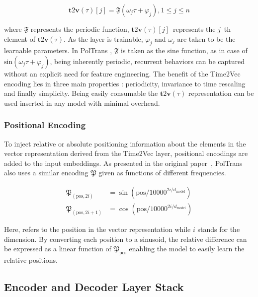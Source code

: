 \documentclass[10pt,journal]{IEEEtran}
\begin{document}
\begin{equation}
\mathbf{t} 2 \mathbf{v}(\tau)[j]=\mathfrak{F}\left(\omega_{j} \tau+\varphi_{j}\right), 1 \leq j \leq n
\end{equation}

where $\mathfrak{F}$ represents the periodic function, ${\mathbf{t} 2 \mathbf{v}(\tau)[j]}$~represents the ${j}$~th element of ${\mathbf{t} 2 \mathbf{v}(\tau)}$. As the layer is trainable, $\varphi_{j}$ and $\omega_{j}$ are taken to be the learnable parameters. In {PolTrans} , $\mathfrak{F}$ is taken as the sine function, as in case of ${\textrm{sin}\left(\omega_{j} \tau+\varphi_{j}\right)}$, being inherently periodic, recurrent behaviors can be captured without an explicit need for feature engineering. The benefit of the Time2Vec encoding lies in three main properties : periodicity, invariance to time rescaling and finally simplicity. Being easily consumable the ${\mathbf{t} 2 \mathbf{v}(\tau)}$ representation can be used inserted in any model with minimal overhead.

\subsubsection{Positional Encoding}
To inject relative or absolute positioning information about the elements in the vector representation derived from the Time2Vec layer, positional encodings are added to the input embeddings. As presented in the original paper~\cite{Vaswani.2017}, {PolTrans} also uses a similar encoding $\mathfrak{P}$ given as functions of different frequencies.

\begin{equation}
\begin{aligned}
\mathfrak{P}_{(\text{pos}, 2 i)} &=\sin \left(\text{pos} / 10000^{2 i / d_{\text{model}}}\right) \\
\mathfrak{P}_{(\text{pos}, 2 i+1)} &=\cos \left(\text{pos} / 10000^{2 i / d_{\text{model}}}\right)
\end{aligned}
\end{equation}

Here,  refers to the position in the vector representation while ${i}$ stands for the dimension. By converting each position to a sinusoid, the relative difference can be expressed as a linear function of $\mathfrak{P}_{\text{pos}}$ enabling the model to easily learn the relative positions.


\subsection{Encoder and Decoder Layer Stack}
\end{document}
